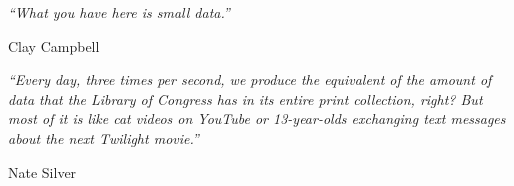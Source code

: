 \documentclass[SDSUThesis.tex]{subfiles}
\begin{document}
\newpage

\begin{flushleft}
\textit{``What you have here is small data.''}
\end{flushleft}

\begin{flushright}
Clay Campbell
\end{flushright}

\vspace{1in}

\begin{flushleft}
\textit{``Every day, three times per second, we produce the equivalent of the amount of data that the Library of Congress has in its entire print collection, right? But most of it is like cat videos on YouTube or 13-year-olds exchanging text messages about the next Twilight movie.''}
\end{flushleft}

\begin{flushright}
Nate Silver
\end{flushright}
\end{document}
